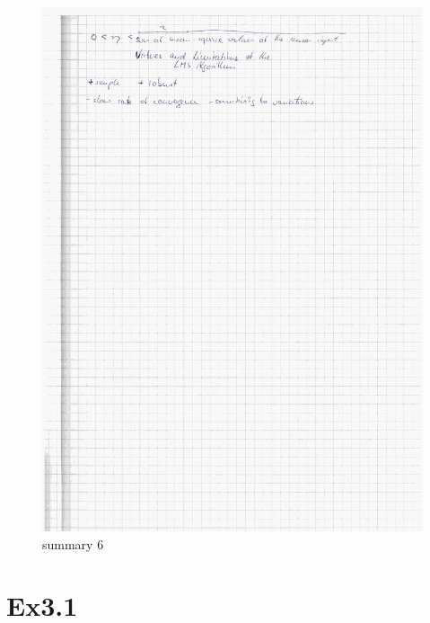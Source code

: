 \documentclass[paper=a4, fontsize=11pt]{scrartcl} %
\numberwithin{equation}{section} %
\numberwithin{figure}{section} %
\numberwithin{table}{section} %
\begin{document}
\begin{figure}[ht]
	\centering
  \includegraphics[width=0.7\textheight]{09.jpg}
	\caption{summary 6}
	\label{fig6}
\end{figure}



\section{Ex3.1}
\end{document}
